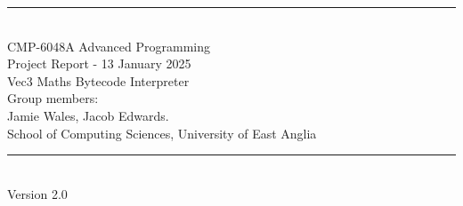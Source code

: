 \documentclass[a4paper, oneside, 11pt]{report}
\begin{document}
\begin{titlepage}
\begin{center}
\rule{12cm}{1mm} \\
\vspace{1cm}
{\large  CMP-6048A Advanced Programming} %
\vspace{7.5cm}
\\{\Large Project Report - 13 January 2025}
\vspace{1.5cm}
\\{\LARGE Vec3 Maths Bytecode Interpreter} %
\vspace{1.0cm}
\\{\Large Group members: \\ Jamie Wales, Jacob Edwards.\ }
\vspace{10.0cm}
\\{\large School of Computing Sciences, University of East Anglia}
\\ \rule{12cm}{0.5mm}
\\ \hspace{8.5cm} {\large Version 2.0}
\end{center}
\end{titlepage}

\setcounter{page}{1}
\end{document}
